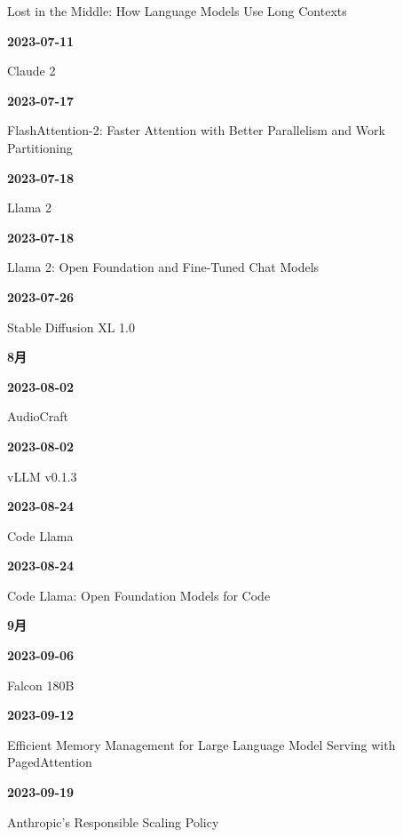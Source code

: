 {\raggedright Lost in the Middle: How Language Models Use Long Contexts\,\cite{src-2b6af707f3ef}\par}
\smallskip
\noindent\textbf{2023-07-11}\par
{\raggedright Claude 2\,\cite{src-39071a9443e5}\par}
\smallskip
\noindent\textbf{2023-07-17}\par
{\raggedright FlashAttention-2: Faster Attention with Better Parallelism and Work Partitioning\,\cite{src-5e1a3a4fc45b}\par}
\smallskip
\noindent\textbf{2023-07-18}\par
{\raggedright Llama 2\,\cite{src-240ca564b6b8}\par}
\smallskip
\noindent\textbf{2023-07-18}\par
{\raggedright Llama 2: Open Foundation and Fine-Tuned Chat Models\,\cite{src-b7e5243e6d59}\par}
\smallskip
\noindent\textbf{2023-07-26}\par
{\raggedright Stable Diffusion XL 1.0\,\cite{src-e79065444906}\par}
\smallskip
\medskip
\noindent\textbf{8月}\par
\smallskip
\noindent\textbf{2023-08-02}\par
{\raggedright AudioCraft\,\cite{chron-ea315935aa0b}\par}
\smallskip
\noindent\textbf{2023-08-02}\par
{\raggedright vLLM v0.1.3\,\cite{src-1ab9d44a819a}\par}
\smallskip
\noindent\textbf{2023-08-24}\par
{\raggedright Code Llama\,\cite{src-9df482e2c96c}\par}
\smallskip
\noindent\textbf{2023-08-24}\par
{\raggedright Code Llama: Open Foundation Models for Code\,\cite{src-bc7aba201f01}\par}
\smallskip
\medskip
\noindent\textbf{9月}\par
\smallskip
\noindent\textbf{2023-09-06}\par
{\raggedright Falcon 180B\,\cite{src-81f670ec1e74}\par}
\smallskip
\noindent\textbf{2023-09-12}\par
{\raggedright Efficient Memory Management for Large Language Model Serving with PagedAttention\,\cite{src-e03b0ba5b24e}\par}
\smallskip
\noindent\textbf{2023-09-19}\par
{\raggedright Anthropic's Responsible Scaling Policy\,\cite{src-394ea6d17701}\par}
